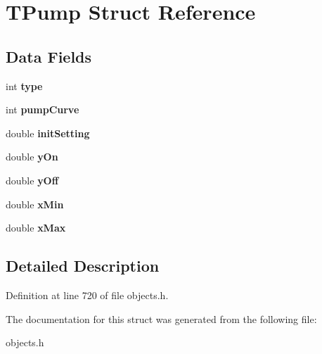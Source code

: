 \hypertarget{struct_t_pump}{}\section{T\+Pump Struct Reference}
\label{struct_t_pump}
\subsection*{Data Fields}
\begin{DoxyCompactItemize}
\item 
\mbox{\label{struct_t_pump_ac765329451135abec74c45e1897abf26}} 
int {\bfseries type}
\item 
\mbox{\label{struct_t_pump_ab4c91b3ec92d66e1ed4b92fac2347753}} 
int {\bfseries pump\+Curve}
\item 
\mbox{\label{struct_t_pump_a0f2a243d874f5e930e82ab9bd8c712b5}} 
double {\bfseries init\+Setting}
\item 
\mbox{\label{struct_t_pump_ac36c574e9322248f5e65804d15a0010b}} 
double {\bfseries y\+On}
\item 
\mbox{\label{struct_t_pump_a0cc731b9395ee613a4eabe8e463c38a3}} 
double {\bfseries y\+Off}
\item 
\mbox{\label{struct_t_pump_a0da3ee9d9cd0abef10c10e090a94f069}} 
double {\bfseries x\+Min}
\item 
\mbox{\label{struct_t_pump_a1bb980dbe87946bc22572d65feeede5c}} 
double {\bfseries x\+Max}
\end{DoxyCompactItemize}


\subsection{Detailed Description}


Definition at line 720 of file objects.\+h.



The documentation for this struct was generated from the following file\+:\begin{DoxyCompactItemize}
\item 
objects.\+h\end{DoxyCompactItemize}

